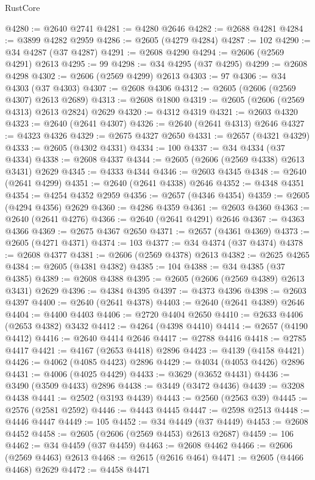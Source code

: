 \begin{lexlean}{RustCore}
\begin{coremodule}
@4280 := @2640 @2741
@4281 := @4280 @2646
@4282 := @2688 @4281
@4284 := @3899 @4282 @2959
@4286 := @2605 (@4279 @4284)
@4287 := 102
@4290 := @34 @4287 (@37 @4287)
@4291 := @2608 @4290
@4294 := @2606 (@2569 @4291) @2613
@4295 := 99
@4298 := @34 @4295 (@37 @4295)
@4299 := @2608 @4298
@4302 := @2606 (@2569 @4299) @2613
@4303 := 97
@4306 := @34 @4303 (@37 @4303)
@4307 := @2608 @4306
@4312 := @2605 (@2606 (@2569 @4307) @2613 @2689)
@4313 := @2608 @1800
@4319 := @2605 (@2606 (@2569 @4313) @2613 @2824) @2629
@4320 := @4312 @4319
@4321 := @2603 @4320
@4323 := @2640 (@2641 @4307)
@4326 := @2640 (@2641 @4313) @2646
@4327 := @4323 @4326
@4329 := @2675 @4327 @2650
@4331 := @2657 (@4321 @4329)
@4333 := @2605 (@4302 @4331)
@4334 := 100
@4337 := @34 @4334 (@37 @4334)
@4338 := @2608 @4337
@4344 := @2605 (@2606 (@2569 @4338) @2613 @3431) @2629
@4345 := @4333 @4344
@4346 := @2603 @4345
@4348 := @2640 (@2641 @4299)
@4351 := @2640 (@2641 @4338) @2646
@4352 := @4348 @4351
@4354 := @4254 @4352 @2959
@4356 := @2657 (@4346 @4354)
@4359 := @2605 (@4294 @4356) @2629
@4360 := @4286 @4359
@4361 := @2603 @4360
@4363 := @2640 (@2641 @4276)
@4366 := @2640 (@2641 @4291) @2646
@4367 := @4363 @4366
@4369 := @2675 @4367 @2650
@4371 := @2657 (@4361 @4369)
@4373 := @2605 (@4271 @4371)
@4374 := 103
@4377 := @34 @4374 (@37 @4374)
@4378 := @2608 @4377
@4381 := @2606 (@2569 @4378) @2613
@4382 := @2625 @4265
@4384 := @2605 (@4381 @4382)
@4385 := 104
@4388 := @34 @4385 (@37 @4385)
@4389 := @2608 @4388
@4395 := @2605 (@2606 (@2569 @4389) @2613 @3431) @2629
@4396 := @4384 @4395
@4397 := @4373 @4396
@4398 := @2603 @4397
@4400 := @2640 (@2641 @4378)
@4403 := @2640 (@2641 @4389) @2646
@4404 := @4400 @4403
@4406 := @2720 @4404 @2650
@4410 := @2633 @4406 (@2653 @4382) @3432
@4412 := @4264 (@4398 @4410)
@4414 := @2657 (@4190 @4412)
@4416 := @2640 @4414 @2646
@4417 := @2788 @4416
@4418 := @2785 @4417
@4421 := @4167 (@2653 @4418) @2896
@4423 := @4139 (@4158 @4421)
@4426 := @4062 (@4085 @4423) @2896
@4429 := @4034 (@4053 @4426) @2896
@4431 := @4006 (@4025 @4429)
@4433 := @3629 (@3652 @4431)
@4436 := @3490 (@3509 @4433) @2896
@4438 := @3449 (@3472 @4436)
@4439 := @3208 @4438
@4441 := @2502 (@3193 @4439)
@4443 := @2560 (@2563 @39)
@4445 := @2576 (@2581 @2592)
@4446 := @4443 @4445
@4447 := @2598 @2513
@4448 := @4446 @4447
@4449 := 105
@4452 := @34 @4449 (@37 @4449)
@4453 := @2608 @4452
@4458 := @2605 (@2606 (@2569 @4453) @2613 @2687)
@4459 := 106
@4462 := @34 @4459 (@37 @4459)
@4463 := @2608 @4462
@4466 := @2606 (@2569 @4463) @2613
@4468 := @2615 (@2616 @464)
@4471 := @2605 (@4466 @4468) @2629
@4472 := @4458 @4471

\end{coremodule}
\end{lexlean}
